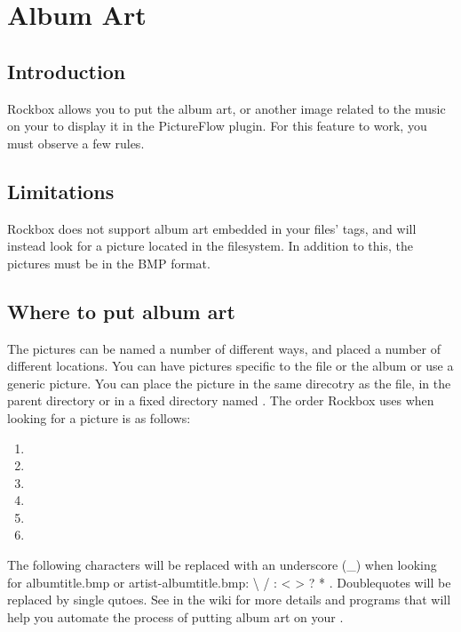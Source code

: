 \chapter{\label{ref:album_art}Album Art}
\section{Introduction}

Rockbox allows you to put the album art, or another image related to the music
on your \dap to display it in the PictureFlow plugin. For this feature to work, you must observe a few rules.

\section{Limitations}

Rockbox does not support album art embedded in your files' tags, and will
instead look for a picture located in the filesystem. In addition to this, the
pictures must be in the BMP format.

\section{Where to put album art}

The pictures can be named a number of different ways, and placed a number of
different locations. You can have pictures specific to the file or the album
or use a generic picture. You can place the picture in the same direcotry
as the file, in the parent directory or in a fixed directory named
. The order Rockbox uses when looking for a picture
is as follows:

\begin{enumerate}
\item  {}
\item  {}
\item  {}
\item  {}
\item  {}
\item  {}
\end{enumerate}

The following characters will be replaced with an underscore (\_) when looking
for albumtitle.bmp or artist-albumtitle.bmp: \textbackslash{} / : \textless{}
\textgreater{} ? * \textbar{}. Doublequotes will be replaced by single qutoes.
See  in the wiki for more details and programs that will
help you automate the process of putting album art on your \dap{}.
